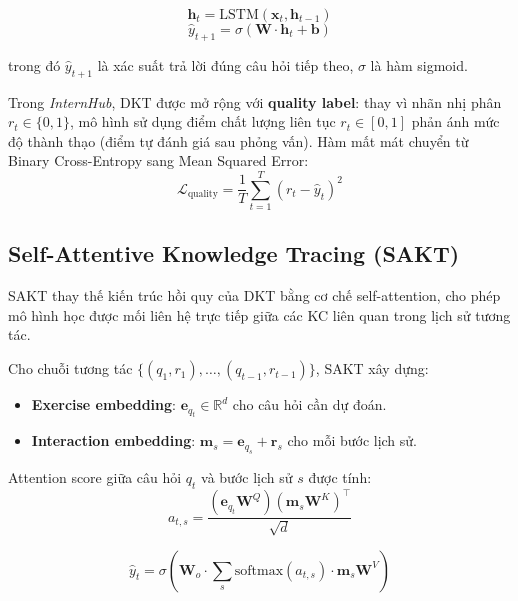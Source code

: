 \documentclass[12pt, a4paper]{report}
\newcommand{\system}{\textit{InternHub}}
\begin{document}
\begin{equation}
  \mathbf{h}_t = \text{LSTM}(\mathbf{x}_t, \mathbf{h}_{t-1})
\end{equation}
\begin{equation}
  \hat{y}_{t+1} = \sigma(\mathbf{W} \cdot \mathbf{h}_t + \mathbf{b})
\end{equation}

trong đó $\hat{y}_{t+1}$ là xác suất trả lời đúng câu hỏi tiếp theo, $\sigma$ là hàm sigmoid.

Trong \system{}, DKT được mở rộng với \textbf{quality label}: thay vì nhãn nhị phân $r_t \in \{0,1\}$, mô hình sử dụng điểm chất lượng liên tục $r_t \in [0, 1]$ phản ánh mức độ thành thạo (điểm tự đánh giá sau phỏng vấn). Hàm mất mát chuyển từ Binary Cross-Entropy sang Mean Squared Error:
\begin{equation}
  \mathcal{L}_{\text{quality}} = \frac{1}{T} \sum_{t=1}^{T} (r_t - \hat{y}_t)^2
\end{equation}

\subsection{Self-Attentive Knowledge Tracing (SAKT)}
\label{subsec:sakt}

SAKT \cite{pandey2019self} thay thế kiến trúc hồi quy của DKT bằng cơ chế self-attention, cho phép mô hình học được mối liên hệ trực tiếp giữa các KC liên quan trong lịch sử tương tác.

Cho chuỗi tương tác $\{(q_1, r_1), \ldots, (q_{t-1}, r_{t-1})\}$, SAKT xây dựng:
\begin{itemize}
  \item \textbf{Exercise embedding}: $\mathbf{e}_{q_t} \in \mathbb{R}^d$ cho câu hỏi cần dự đoán.
  \item \textbf{Interaction embedding}: $\mathbf{m}_s = \mathbf{e}_{q_s} + \mathbf{r}_s$ cho mỗi bước lịch sử.
\end{itemize}

Attention score giữa câu hỏi $q_t$ và bước lịch sử $s$ được tính:
\begin{equation}
  a_{t,s} = \frac{(\mathbf{e}_{q_t} \mathbf{W}^Q)(\mathbf{m}_s \mathbf{W}^K)^\top}{\sqrt{d}}
\end{equation}

\begin{equation}
  \hat{y}_t = \sigma\left(\mathbf{W}_o \cdot \sum_s \text{softmax}(a_{t,s}) \cdot \mathbf{m}_s \mathbf{W}^V\right)
\end{equation}
\end{document}
